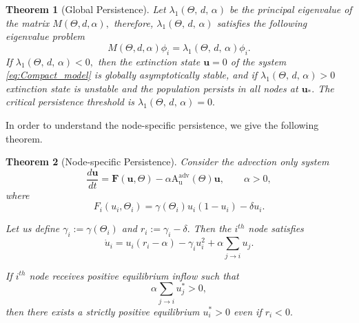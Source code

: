 \documentclass[12pt]{article}
\newtheorem{theorem}{Theorem}[section] %
\begin{document}
\begin{theorem}[Global Persistence]
     Let $\lambda_1(\Theta,\,d,\,\alpha)$ be the principal eigenvalue of the matrix $M(\Theta, d, \alpha),$ therefore, $\lambda_1(\Theta,\,d,\,\alpha)$ satisfies the following eigenvalue problem \begin{equation}
    M(\Theta, d, \alpha)\phi_i = \lambda_1(\Theta,\,d,\,\alpha)\phi_i.
\end{equation}
If $\lambda_1(\Theta,\,d,\,\alpha)< 0,$ then the extinction state $\mathbf{u}=0$ of the system \eqref{eq:Compact_model} is globally asymptotically stable, and if $\lambda_1(\Theta,\,d,\,\alpha)> 0$ extinction state is unstable and the population persists in all nodes at $\mathbf{u}_*.$ The critical persistence threshold is $\lambda_1(\Theta,\,d,\,\alpha)=0.$
\end{theorem}
In order to understand the node-specific persistence, we give the following theorem. 
\begin{theorem}[Node-specific Persistence]
Consider the advection only system
\[
\frac{d \mathbf{u}}{dt}
=
\mathbf{F}(\mathbf{u}, \Theta)
-
\alpha \mathrm{A_u^{adv}}(\Theta)\mathbf{u},
\qquad \alpha>0,
\]
where 
\[
F_i(u_i,\Theta_i)
=
\gamma(\Theta_i)u_i(1-u_i)
-
\delta u_i.
\]

Let us define $\gamma_i := \gamma(\Theta_i)$ and 
$r_i := \gamma_i - \delta.$ Then the $i^{th}$ node satisfies
\begin{equation*}
    \dot u_i
=
u_i(r_i - \alpha)
-
\gamma_i u_i^2
+
\alpha \sum_{j\to i} u_j.
\end{equation*}

If $i^{th}$ node receives positive equilibrium inflow such that 
\begin{equation}
    \alpha \sum_{j\to i} u_j^* > 0,
\end{equation}
then there exists a strictly positive equilibrium $u_i^*>0$
even if $r_i < 0.$ 
\end{theorem}
\end{document}
